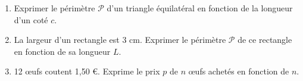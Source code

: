 
\begin{enumerate}
\item Exprimer le périmètre $\mathscr P$ d'un triangle équilatéral en fonction de la longueur d'un coté $c$.
\item La largeur d'un rectangle est 3 cm. Exprimer le périmètre $\mathscr P$ de ce rectangle en fonction de sa longueur $L$.
\item 12 œufs coutent 1,50 \euro{}. Exprime le prix $p$ de $n$ œufs achetés en fonction de $n$. 
\end{enumerate}